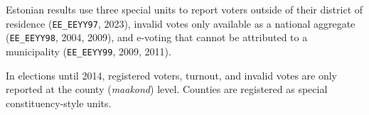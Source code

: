 Estonian results use three special units to report voters outside of their
district of residence (\texttt{EE\_EEYY97}, 2023), invalid votes only available
as a national aggregate (\texttt{EE\_EEYY98}, 2004, 2009), and e-voting that cannot
be attributed to a municipality (\texttt{EE\_EEYY99}, 2009, 2011).

In elections until 2014, registered voters, turnout, and invalid votes are only reported
at the county (\emph{maakond}) level. Counties are registered as special constituency-style units.